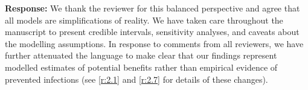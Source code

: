 \documentclass[11pt]{article}
\newcommand{\response}[1]{\textbf{Response:} #1}
\begin{document}
\begin{enumerate}[label=\textbf{R3.\arabic*.}, leftmargin=*]
\response{We thank the reviewer for this balanced perspective and agree that all models are simplifications of reality. We have taken care throughout the manuscript to present credible intervals, sensitivity analyses, and caveats about the modelling assumptions. In response to comments from all reviewers, we have further attenuated the language to make clear that our findings represent modelled estimates of potential benefits rather than empirical evidence of prevented infections (see \ref{r:2.1} and \ref{r:2.7} for details of these changes).}

\end{enumerate}



\end{document}
